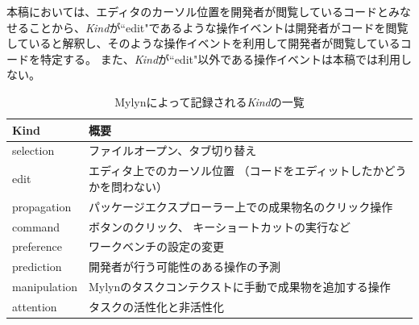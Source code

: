 \documentclass[a4paper]{jsbook}
\begin{document}
本稿においては、エディタのカーソル位置を開発者が閲覧しているコードとみなせることから、{\it Kind}が``edit"であるような操作イベントは開発者がコードを閲覧していると解釈し、そのような操作イベントを利用して開発者が閲覧しているコードを特定する。
また、{\it Kind}が``edit"以外である操作イベントは本稿では利用しない。

\begin{table}[tb]
  \centering
  \caption{Mylynによって記録される{\it Kind}の一覧}
  \label{kind_table}
\begin{tabular}{ll}
  \hline
  Kind & 概要\\
  \hline
  selection & ファイルオープン、タブ切り替え\\
  edit & エディタ上でのカーソル位置 （コードをエディットしたかどうかを問わない）\\
  propagation & パッケージエクスプローラー上での成果物名のクリック操作\\
  command & ボタンのクリック、 キーショートカットの実行など\\
  preference & ワークベンチの設定の変更\\
  prediction & 開発者が行う可能性のある操作の予測\cite{Kersten:2006}\\
  manipulation & Mylynのタスクコンテクストに手動で成果物を追加する操作\\
  attention & タスクの活性化と非活性化\\
  \hline
\end{tabular}
\end{table}
\end{document}
